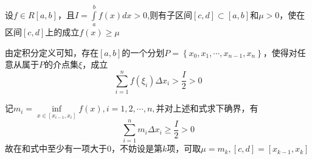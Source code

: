 \documentclass[lang=cn,10pt]{elegantbook}
\begin{document}
\begin{example}
	设$f\in R[a,b]$，且$I=\int\limits_a^b{f\left( x \right) dx}>0$,则有子区间$\left[ c,d \right] \subset \left[ a,b \right] $和$\mu >0$，使在区间$[c,d]$上的成立$f(x)\ge \mu $
\end{example}
\begin{solution}
	
	由定积分定义可知，存在$[a,b]$的一个分划$P=\left\{ x_0,x_1,\cdots ,x_{n-1},x_n \right\} $，使得对任意从属于$P$的介点集$\xi$，成立
	\begin{equation*}
		\sum_{i=1}^n{f\left( \xi _i \right) \varDelta x_i}>\frac{I}{2}>0
	\end{equation*}
	
	记$m_i=\mathop {\mathrm{inf}} \limits_{x\in \left[ x_{i-1},x_i \right]}f\left( x \right) ,i=1,2,\cdots ,n,\text{并对上述和式求下确界，有}$
	\begin{equation*}
		\sum_{i=1}^n{m_{i} \varDelta x_i}\ge\frac{I}{2}>0
	\end{equation*}
	故在和式中至少有一项大于$0$，不妨设是第$k$项，可取$\mu =m_{k},[c,d]=[x_{k-1},x_{k}]$
\end{solution}
\end{document}
